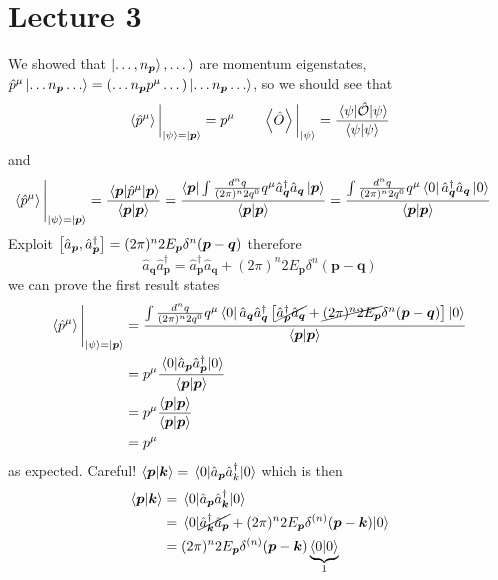 \section{Lecture 3}

We showed that $\ket{\dots, n_{\bm{p}}}, \dots)$ are momentum eigenstates, $\hat{p}^{\mu} \ket{\dots n_{\bm{p}} \dots} = (\dots n_{\bm{p}}p^\mu \dots) \ket{\dots n_{\bm{p}} \dots}$, so we should see that 
\begin{equation}
    \expval{\hat{p}^{\mu}}\bigg\vert_{\ket{\psi} = \ket{\bm{p}}} = p^\mu \quad \quad  \expval{\hat{O}}\bigg\vert_{\ket{\psi}} = \frac{\mel{\psi}{\hat{\mathcal{O}}}{\psi}}{\expval{\psi|\psi}}
\end{equation}
and 
\begin{align}
    \expval{\hat{p}^{\mu}}\Bigg|_{\ket{\psi} = \ket{\bm{p}}} & = \frac{\mel{\bm{p}}{\hat{p}^\mu}{\bm{p}}}{\expval{\bm{p}|\bm{p}}}   = \frac{\bra{\bm{p}} \int \frac{d^n q}{(2\pi)^n 2q^0} q^\mu \hat{a}_{\bm{q}}^\dagger \hat{a}_{\bm{q}} \ket{\bm{p}} }{\expval{\bm{p}|\bm{p}}} = \frac{\int \frac{d^n q}{(2\pi)^n 2q^0}  q^\mu   \bra{0}  \hat{a}_{\bm{q}}^\dagger \hat{a}_{\bm{q}} \ket{0} }{\expval{\bm{p}|\bm{p}}}
\end{align}
Exploit $\comm{\hat{a}_{\bm{p}}}{\hat{a}_{\bm{p}}^{\dagger}} = (2\pi)^n 2E_{\bm{p}} \delta^{n}(\bm{p} - \bm{q})$ therefore 
\begin{equation}
    \hat{a}_{\bm{q}} \hat{a}_{\bm{p}}^{\dagger} = \hat{a}_{\bm{p}}^{\dagger} \hat{a}_{\bm{q}} + (2\pi)^n 2E_{\bm{p}} \delta^{n}(\bm{p} - \bm{q})
\end{equation}
we can prove the first result states
\begin{align}
    \expval{\hat{p}^{\mu}}\Bigg|_{\ket{\psi} = \ket{\bm{p}}} & = \frac{\int \frac{d^n q}{(2\pi)^n 2q^0}  q^\mu   \bra{0} \hat{a}_{\bm{q}} \hat{a}_{\bm{q}}^\dagger  \left[  \cancel{\hat{a}_{\bm{p}}^{\dagger} \hat{a}_{\bm{q}}} + \cancel{(2\pi)^n 2E_{\bm{p}}} \delta^{n}(\bm{p} - \bm{q})  \right] \ket{0} }{\expval{\bm{p}|\bm{p}}} \nonumber\\
    & = p^\mu \frac{\mel{0}{  \hat{a}_{\bm{p}} \hat{a}_{\bm{p}}^\dagger  }{0}}{\expval{\bm{p}|\bm{p}}}\nonumber\\
    & = p^\mu \frac{\expval{\bm{p}|\bm{p}}}{\expval{\bm{p}|\bm{p}}} \nonumber\\
    & = p^\mu 
\end{align}
as expected. Careful! $\expval{\bm{p}|\bm{k}} = \mel{0}{\hat{a}_{\bm{p}} \hat{a}_{k}^{\dagger} }{0}$ 
which is then 
\begin{align}
    \expval{\bm{p}|\bm{k}} & = \mel{0}{\hat{a}_{\bm{p}} \hat{a}_{\bm{k}}^{\dagger} }{0} \nonumber\\
      &=  \mel{0}{ \cancel{\hat{a}_{\bm{k}}^{\dagger}\hat{a}_{\bm{p}}} +(2\pi)^n 2E_{\bm{p}}\delta^{(n)} (\bm{p} - \bm{k})  }{0} \nonumber\\
    & = (2\pi)^n 2E_{\bm{p}}\delta^{(n)} (\bm{p} - \bm{k}) \underbrace{\expval{0|0}}_\text{$1$}
 \end{align}
